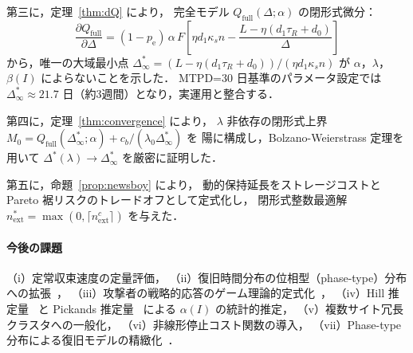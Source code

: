 \documentclass[12pt,a4paper]{article}
\theoremstyle{plain}
\theoremstyle{definition}
\theoremstyle{remark}
\newcommand{\pe}{p_{\mathrm{e}}}
\newcommand{\Qf}{Q_{\mathrm{full}}}
\newcommand{\betaI}{\beta(I)}
\newcommand{\alphI}{\alpha(I)}
\newcommand{\Dopt}{\Delta^{*}}
\newcommand{\Dinf}{\Delta^{*}_{\infty}}
\begin{document}
第三に，定理~\ref{thm:dQ} により，
完全モデル $\Qf(\Delta;\alpha)$ の閉形式微分：
\[
\frac{\partial\Qf}{\partial\Delta}
=(1-\pe)\,\alpha\,F\!\left[\eta d_1\kappa_s n-\frac{L-\eta(d_1\tau_R+d_0)}{\Delta}\right]
\]
から，唯一の大域最小点 $\Dinf=(L-\eta(d_1\tau_R+d_0))/(\eta d_1\kappa_s n)$ が
$\alpha$，$\lambda$，$\betaI$ によらないことを示した．
MTPD=30 日基準のパラメータ設定では $\Dinf\approx21.7$ 日（約3週間）となり，実運用と整合する．

第四に，定理~\ref{thm:convergence} により，
$\lambda$ 非依存の閉形式上界 $M_0=\Qf(\Dinf;\alpha)+c_b/(\lambda_0\Dinf)$ を
陽に構成し，Bolzano-Weierstrass 定理を用いて $\Dopt(\lambda)\to\Dinf$ を厳密に証明した．

第五に，命題~\ref{prop:newsboy} により，
動的保持延長をストレージコストと Pareto 裾リスクのトレードオフとして定式化し，
閉形式整数最適解 $n_{\mathrm{ext}}^*=\max(0,\lceil n_{\mathrm{ext}}^c\rceil)$ を与えた．

\paragraph{今後の課題}
（i）定常収束速度の定量評価，
（ii）復旧時間分布の位相型（phase-type）分布への拡張~\cite{asmussen2003}，
（iii）攻撃者の戦略的応答のゲーム理論的定式化~\cite{laszka2017}，
（iv）Hill 推定量~\cite{hill1975} と Pickands 推定量~\cite{pickands1975} による $\alphI$ の統計的推定，
（v）複数サイト冗長クラスタへの一般化，
（vi）非線形停止コスト関数の導入，
（vii）Phase-type 分布による復旧モデルの精緻化~\cite{norris1997}．

\end{document}
